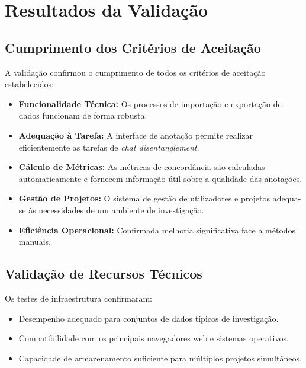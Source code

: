 \section{Resultados da Validação}

\subsection{Cumprimento dos Critérios de Aceitação}
A validação confirmou o cumprimento de todos os critérios de aceitação estabelecidos:

\begin{itemize}
    \item \textbf{Funcionalidade Técnica:} Os processos de importação e exportação de dados funcionam de forma robusta.
    \item \textbf{Adequação à Tarefa:} A interface de anotação permite realizar eficientemente as tarefas de \textit{chat disentanglement}.
    \item \textbf{Cálculo de Métricas:} As métricas de concordância são calculadas automaticamente e fornecem informação útil sobre a qualidade das anotações.
    \item \textbf{Gestão de Projetos:} O sistema de gestão de utilizadores e projetos adequa-se às necessidades de um ambiente de investigação.
    \item \textbf{Eficiência Operacional:} Confirmada melhoria significativa face a métodos manuais.
\end{itemize}

\subsection{Validação de Recursos Técnicos}
Os testes de infraestrutura confirmaram:
\begin{itemize}
    \item Desempenho adequado para conjuntos de dados típicos de investigação.
    \item Compatibilidade com os principais navegadores web e sistemas operativos.
    \item Capacidade de armazenamento suficiente para múltiplos projetos simultâneos.
\end{itemize}

